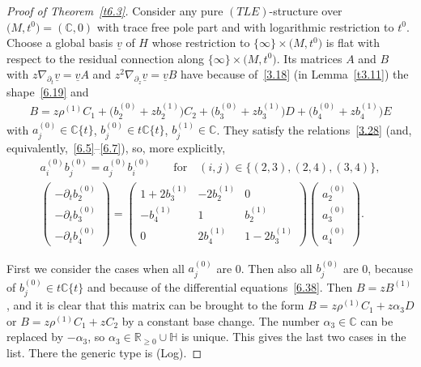 \documentclass[10pt,a4paper]{amsart}
\numberwithin{equation}{section}
\numberwithin{figure}{section}
\newcommand{\C}{{\mathbb C}}
\newcommand{\R}{{\mathbb R}}
\renewcommand{\H}{{\mathbb H}}
\newcommand{\uuuu}{\underline}
\newcommand{\paa}{\partial}
\newcommand{\nnn}{\nabla}
\begin{document}
\begin{proof}[Proof of Theorem~\ref{t6.3}]
Consider any pure $(TLE)$-structure over $\big(M,t^0\big)=(\C,0)$
with trace free pole part and with logarithmic restriction
to $t^0$. Choose a global basis $\uuuu{v}$ of $H$
whose restriction to
$\{\infty\}\times \big(M,t^0\big)$ is flat with
respect to the residual connection along
$\{\infty\}\times \big(M,t^0\big)$.
Its matrices $A$ and $B$ with
$z\nnn_{\paa_t}\uuuu{v}=\uuuu{v}A$ and
$z^2\nnn_{\paa_z}\uuuu{v}=\uuuu{v}B$
have because of~\eqref{3.18} (in Lemma~\ref{t3.11})
the shape~\eqref{6.19} and
\begin{gather*}%
B=z\rho^{(1)}C_1+\big(b_2^{(0)}+zb_2^{(1)}\big)C_2 +
\big(b_3^{(0)}+zb_3^{(1)}\big)D+\big(b_4^{(0)}+zb_4^{(1)}\big)E
\end{gather*}
with $a_j^{(0)}\in\C\{t\}$, $b_j^{(0)}\in t\C\{t\}$,
$b_j^{(1)}\in\C$. They satisfy the relations~\eqref{3.28}
(and, equivalently,~\eqref{6.5}--\eqref{6.7}),
so, more explicitly,
\begin{gather}\label{6.37}
a_i^{(0)}b_j^{(0)}=a_j^{(0)}b_i^{(0)}\qquad\text{for}\quad
(i,j)\in\{(2,3),(2,4),(3,4)\},
\\[1ex]
\begin{pmatrix}-\paa_tb_2^{(0)} \\ -\paa_tb_3^{(0)} \\
-\paa_tb_4^{(0)} \end{pmatrix}
= \begin{pmatrix}1+2b_3^{(1)} & -2b_2^{(1)} & 0 \\
-b_4^{(1)} & 1 & b_2^{(1)} \\
0 & 2b_4^{(1)} & 1-2b_3^{(1)} \end{pmatrix}
\begin{pmatrix} a_2^{(0)} \\ a_3^{(0)} \\ a_4^{(0)}
\end{pmatrix}\!. \label{6.38}
\end{gather}

First we consider the cases when all $a_j^{(0)}$ are 0.
Then also all $b_j^{(0)}$ are 0, because of
$b_j^{(0)}\in t\C\{t\}$ and because of the differential
equations~\eqref{6.38}.
Then $B=zB^{(1)}$, and it is clear that this matrix
can be brought to the form $B=z\rho^{(1)}C_1+ z\alpha_3 D$
or $B=z\rho^{(1)}C_1+zC_2$
by a constant base change.
The number $\alpha_3\in\C$ can be replaced by $-\alpha_3$, so
$\alpha_3\in\R_{\geq 0}\cup\H$ is unique.
This gives the last two cases in the list.
There the generic type is (Log).


\end{proof}
\end{document}
